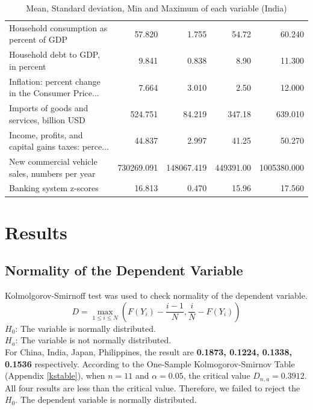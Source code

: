 \documentclass[11pt]{article}
\begin{document}
\begin{table}[H]
{\begin{tabular}{lrrrr}
Household consumption as percent of GDP            &      57.820 &       1.755 &      54.72 &       60.240 \\
Household debt to GDP, in percent                  &       9.841 &       0.838 &       8.90 &       11.300 \\
Inflation: percent change in the Consumer Price... &       7.664 &       3.010 &       2.50 &       12.000 \\
Imports of goods and services, billion USD         &     524.751 &      84.219 &     347.18 &      639.010 \\
Income, profits, and capital gains taxes: perce... &      44.837 &       2.997 &      41.25 &       50.270 \\
New commercial vehicle sales, numbers per year     &  730269.091 &  148067.419 &  449391.00 &  1005380.000 \\
Banking system z-scores                            &      16.813 &       0.470 &      15.96 &       17.560 \\
\bottomrule
\end{tabular}}
\caption{Mean, Standard deviation, Min and Maximum of each variable (India)}
\label{tab:describe_ind}
\end{table}

\section{Results}\label{results}
\subsection{Normality of the Dependent Variable}\label{normality_check}
Kolmolgorov-Smirnoff test was used to check normality of the dependent variable.
$$D=\underset{1 \leq i \leq N}{\max}(F(Y_i)-\frac{i-1}{N},\frac{i}{N}-F(Y_i))$$
$H_0$: The variable is normally distributed.\\
$H_a$: The variable is not normally distributed.\\
For China, India, Japan, Philippines, the result are \textbf{0.1873, 0.1224, 0.1338, 0.1536} respectively. According to the One-Sample Kolmogorov-Smirnov Table (Appendix \ref{kstable}), when $n=11$ and $\alpha=0.05$, the critical value $D_{n,a}=0.3912$. All four results are less than the critical value. Therefore, we failed to reject the $H_0$. The dependent variable is normally distributed.
\end{document}
